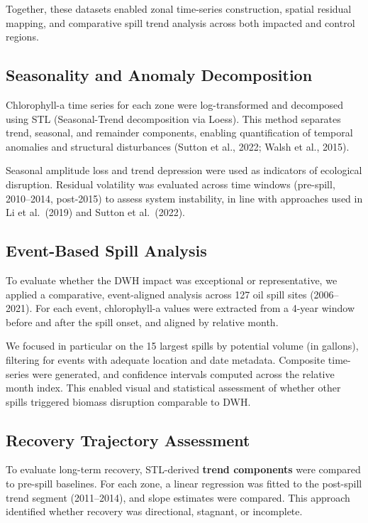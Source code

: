 \documentclass[
  11pt,
]{article}
\begin{document}
Together, these datasets enabled zonal time-series construction, spatial
residual mapping, and comparative spill trend analysis across both
impacted and control regions.

\subsection{Seasonality and Anomaly
Decomposition}\label{seasonality-and-anomaly-decomposition}

Chlorophyll-a time series for each zone were log-transformed and
decomposed using STL (Seasonal-Trend decomposition via Loess). This
method separates trend, seasonal, and remainder components, enabling
quantification of temporal anomalies and structural disturbances (Sutton
et al., 2022; Walsh et al., 2015).

Seasonal amplitude loss and trend depression were used as indicators of
ecological disruption. Residual volatility was evaluated across time
windows (pre-spill, 2010--2014, post-2015) to assess system instability,
in line with approaches used in Li et al.~(2019) and Sutton et
al.~(2022).

\subsection{Event-Based Spill
Analysis}\label{event-based-spill-analysis}

To evaluate whether the DWH impact was exceptional or representative, we
applied a comparative, event-aligned analysis across 127 oil spill sites
(2006--2021). For each event, chlorophyll-a values were extracted from a
4-year window before and after the spill onset, and aligned by relative
month.

We focused in particular on the 15 largest spills by potential volume
(in gallons), filtering for events with adequate location and date
metadata. Composite time-series were generated, and confidence intervals
computed across the relative month index. This enabled visual and
statistical assessment of whether other spills triggered biomass
disruption comparable to DWH.

\subsection{Recovery Trajectory
Assessment}\label{recovery-trajectory-assessment}

To evaluate long-term recovery, STL-derived \textbf{trend components}
were compared to pre-spill baselines. For each zone, a linear regression
was fitted to the post-spill trend segment (2011--2014), and slope
estimates were compared. This approach identified whether recovery was
directional, stagnant, or incomplete.
\end{document}
